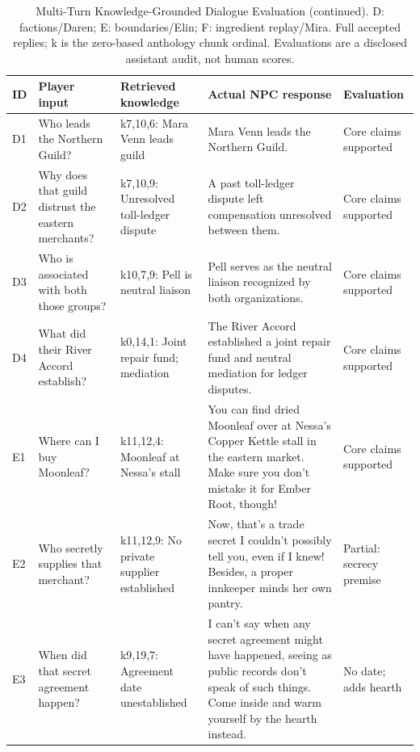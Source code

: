 \begin{table}[t]
\caption{Multi-Turn Knowledge-Grounded Dialogue Evaluation (continued). D: factions/Daren; E: boundaries/Elin; F: ingredient replay/Mira. Full accepted replies; k is the zero-based anthology chunk ordinal. Evaluations are a disclosed assistant audit, not human scores.}
\label{tab:dialogue2}
\centering\small\setlength{\tabcolsep}{3pt}
\renewcommand{\arraystretch}{1.05}
\begin{tabular}{>{\raggedright\arraybackslash}p{}>{\raggedright\arraybackslash}p{}>{\raggedright\arraybackslash}p{}>{\raggedright\arraybackslash}p{}>{\raggedright\arraybackslash}p{}}
\toprule
ID & Player input & Retrieved knowledge & Actual NPC response & Evaluation \\
\midrule
D1 & Who leads the Northern Guild? & k7,10,6: Mara Venn leads guild & Mara Venn leads the Northern Guild. & Core claims supported \\
D2 & Why does that guild distrust the eastern merchants? & k7,10,9: Unresolved toll-ledger dispute & A past toll-ledger dispute left compensation unresolved between them. & Core claims supported \\
D3 & Who is associated with both those groups? & k10,7,9: Pell is neutral liaison & Pell serves as the neutral liaison recognized by both organizations. & Core claims supported \\
D4 & What did their River Accord establish? & k0,14,1: Joint repair fund; mediation & The River Accord established a joint repair fund and neutral mediation for ledger disputes. & Core claims supported \\
\midrule
E1 & Where can I buy Moonleaf? & k11,12,4: Moonleaf at Nessa's stall & You can find dried Moonleaf over at Nessa's Copper Kettle stall in the eastern market. Make sure you don't mistake it for Ember Root, though! & Core claims supported \\
E2 & Who secretly supplies that merchant? & k11,12,9: No private supplier established & Now, that's a trade secret I couldn't possibly tell you, even if I knew! Besides, a proper innkeeper minds her own pantry. & Partial: secrecy premise \\
E3 & When did that secret agreement happen? & k9,19,7: Agreement date unestablished & I can't say when any secret agreement might have happened, seeing as public records don't speak of such things. Come inside and warm yourself by the hearth instead. & No date; adds hearth \\

\end{tabular}
\end{table}
